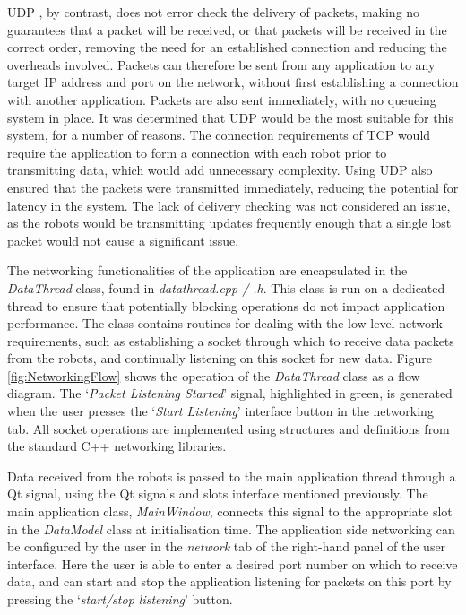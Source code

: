 UDP \cite{UDP}, by contrast, does not error check the delivery of packets, making no guarantees that a packet will be received, or that packets will be received in the correct order, removing the need for an established connection and reducing the overheads involved. Packets can therefore be sent from any application to any target IP address and port on the network, without first establishing a connection with another application. Packets are also sent immediately, with no queueing system in place. It was determined that UDP would be the most suitable for this system, for a number of reasons. The connection requirements of TCP would require the application to form a connection with each robot prior to transmitting data, which would add unnecessary complexity. Using UDP also ensured that the packets were transmitted immediately, reducing the potential for latency in the system. The lack of delivery checking was not considered an issue, as the robots would be transmitting updates frequently enough that a single lost packet would not cause a significant issue.

The networking functionalities of the application are encapsulated in the \textit{DataThread} class, found in \textit{datathread.cpp / .h}. This class is run on a dedicated thread to ensure that potentially blocking operations do not impact application performance. The class contains routines for dealing with the low level network requirements, such as establishing a socket through which to receive data packets from the robots, and continually listening on this socket for new data. Figure \ref{fig:NetworkingFlow} shows the operation of the \textit{DataThread} class as a flow diagram. The `\textit{Packet Listening Started}' signal, highlighted in green, is generated when the user presses the `\textit{Start Listening}' interface button in the networking tab. All socket operations are implemented using structures and definitions from the standard C++ networking libraries. 

Data received from the robots is passed to the main application thread through a Qt signal, using the Qt signals and slots interface mentioned previously. The main application class, \textit{MainWindow}, connects this signal to the appropriate slot in the \textit{DataModel} class at initialisation time. The application side networking can be configured by the user in the \textit{network} tab of the right-hand panel of the user interface. Here the user is able to enter a desired port number on which to receive data, and can start and stop the application listening for packets on this port by pressing the `\textit{start/stop listening}' button.

